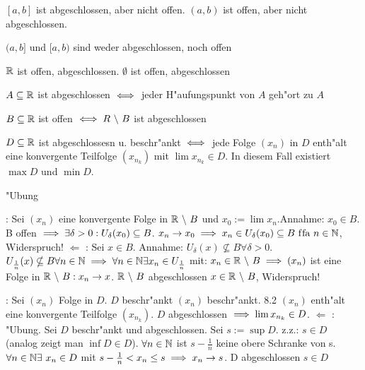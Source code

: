 \documentclass[a4paper,twoside,DIV15,BCOR12mm]{scrbook}
\begin{document}
\begin{beispiele}
\item $[a, b]$ ist abgeschlossen, aber nicht offen. $(a, b)$ ist offen, aber nicht abgeschlossen.
\item $(a, b]$ und $[a, b)$ sind weder abgeschlossen, noch offen
\item $\mathbb{R}$ ist offen, abgeschlossen. $\emptyset$ ist offen, abgeschlossen
\end{beispiele}


\begin{hilfssatz*}
\begin{liste}
\item $A \subseteq \mathbb{R}$ ist abgeschlossen $\iff$ jeder H"aufungspunkt von $A$ geh"ort zu $A$
\item $B \subseteq \mathbb{R}$ ist offen $\iff R\ \backslash\ B$ ist abgeschlossen
\item $D \subseteq \mathbb{R}$ ist abgeschlossesn u. beschr"ankt $\iff$ jede Folge $(x_n)$ in $D$ enth"alt eine konvergente Teilfolge $(x_{n_k})$ mit $\lim x_{n_k} \in D$. In diesem Fall existiert $\max D$ und $\min D$.
\end{liste}
\end{hilfssatz*}

\begin{beweis}
\begin{liste}
\item "Ubung
\item \glqq \folgt \grqq: Sei $(x_n)$ eine konvergente Folge in $\MdR\ \backslash\ B$ und $x_0:=\lim x_n$.Annahme: $x_0 \in B$. B offen $\implies \exists \delta>0 : U_\delta(x_0) \subseteq B$. $x_n \to x_0 \implies x_n \in U_\delta(x_0) \subseteq B \text{ f\/fa } n \in\mathbb{N}$, Widerspruch! \glqq $\Leftarrow$ \grqq: Sei $x \in B$. Annahme: $U_\delta(x) \nsubseteq B \forall \delta>0$. 
\folgt $U_{\frac{1}{n}}(x) \nsubseteq B \forall n \in \mathbb{N} 
\implies \forall n \in \mathbb{N} \exists x_n \in U_{\frac{1}{n}}$ mit: $x_n \in \mathbb{R}\ \backslash\ B \implies (x_n)$ ist eine Folge in $\MdR\ \backslash\ B: x_n \to x$. $\MdR\ \backslash\ B$ abgeschlossen \folgt $x \in \mathbb{R}\ \backslash\ B$, Widerspruch!
\item \glqq \folgt \grqq: Sei $(x_n)$ Folge in $D$. $D$ beschr"ankt \folgt $(x_n)$ beschr"ankt. 8.2 \folgt $(x_n)$ enth"alt eine konvergente Teilfolge $(x_{n_k})$. $D$ abgeschlossen $\implies \lim x_{n_k} \in D$. \glqq $\Leftarrow$ \grqq: "Ubung. Sei $D$ beschr"ankt und abgeschlossen. Sei $s:=\sup D$. z.z.: $s \in D$ (analog zeigt man $\inf D \in D$). $\forall n \in \mathbb{N}$ ist $s-\frac{1}{n}$ keine obere Schranke von s. \folgt $\forall n \in\mathbb{N}\exists\ x_n \in D$ mit $s - \frac{1}{n} < x_n \le s \implies x_n \to s$. D abgeschlossen \folgt $s \in D$
\end{liste}
\end{beweis}
\end{document}
